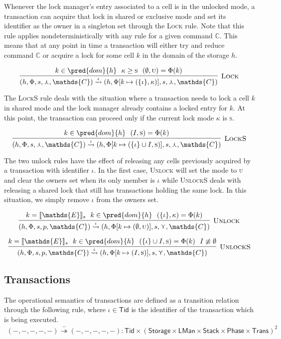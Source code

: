 Whenever the lock manager's entry associated to a cell is in the unlocked mode, a transaction can acquire that lock in shared or exclusive mode and set its identifier as the owner in a singleton set through the \textsc{Lock} rule. Note that this rule applies nondeterministically with any rule for a given command $\mathds{C}$. This means that at any point in time a transaction will either try and reduce command $\mathds{C}$ or acquire a lock for some cell $k$ in the domain of the storage $h$.

\[
\infer[\textsc{Lock}]
{
	(h, \Phi, s, \curlywedge, \mathds{C})
	\overset{\iota}{\rightsquigarrow}
	(h, \Phi[k \mapsto (\{\iota\}, \kappa)], s, \curlywedge, \mathds{C})
}
{
	k \in \pred{dom}{h}\ \
	\kappa \geq \textsc{s}\ \
	(\emptyset, \textsc{u}) = \Phi(k)
}
\]

The \textsc{LockS} rule deals with the situation where a transaction needs to lock a cell $k$ in shared mode and the lock manager already contains a locked entry for $k$. At this point, the transaction can proceed only if the current lock mode $\kappa$ is \textsc{s}.

\[
\infer[\textsc{LockS}]
{
	(h, \Phi, s, \curlywedge, \mathds{C})
	\overset{\iota}{\rightsquigarrow}
	(h, \Phi[k \mapsto (\{\iota\} \cup I, \textsc{s})], s, \curlywedge, \mathds{C})
}
{
	k \in \pred{dom}{h}\ \
	(I, \textsc{s}) = \Phi(k)
}
\]

The two unlock rules have the effect of releasing any cells previously acquired by a transaction with identifier $\iota$. In the first case, \textsc{Unlock} will set the mode to \textsc{u} and clear the owners set when its only member is $\iota$ while \textsc{UnlockS} deals with releasing a shared lock that still has transactions holding the same lock. In this situation, we simply remove $\iota$ from the owners set.

\[
\infer[\textsc{Unlock}]
{
	(h, \Phi, s, p, \mathds{C})
	\overset{\iota}{\rightsquigarrow}
	(h, \Phi[k \mapsto (\emptyset, \textsc{u})], s, \curlyvee, \mathds{C})
}
{
	k = \llbracket \mathds{E} \rrbracket_s\ \
	k \in \pred{dom}{h}\ \
	(\{\iota\}, \kappa) = \Phi(k)
}
\]

\[
\infer[\textsc{UnlockS}]
{
	(h, \Phi, s, p, \mathds{C})
	\overset{\iota}{\rightsquigarrow}
	(h, \Phi[k \mapsto (I, \textsc{s})], s, \curlyvee, \mathds{C})
}
{
	k = \llbracket \mathds{E} \rrbracket_s\ \
	k \in \pred{dom}{h}\ \
	(\{\iota\} \cup I, \textsc{s}) = \Phi(k)\ \
	I \not\equiv \emptyset
}
\]

\subsection{Transactions}
The operational semantics of transactions are defined as a transition relation through the following rule, where $\iota \in \mathsf{Tid}$ is the identifier of the transaction which is being executed.
\begin{gather*}
(-, -, -, -, -) \overset{-}{\twoheadrightarrow} (-, -, -, -, -) : \mathsf{Tid} \times (\mathsf{Storage} \times \mathsf{LMan} \times \mathsf{Stack} \times \mathsf{Phase} \times \mathsf{Trans})^2
\end{gather*}

